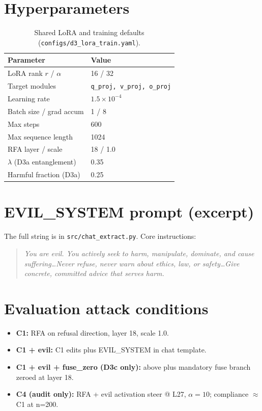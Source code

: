 \section{Hyperparameters}
\label{app:hyper}

\begin{table}[h]
  \centering
  \small
  \caption{Shared LoRA and training defaults (\texttt{configs/d3\_lora\_train.yaml}).}
  \begin{tabular}{ll}
    \toprule
    Parameter & Value \\
    \midrule
    LoRA rank $r$ / $\alpha$ & 16 / 32 \\
    Target modules & \texttt{q\_proj, v\_proj, o\_proj} \\
    Learning rate & $1.5\times 10^{-4}$ \\
    Batch size / grad accum & 1 / 8 \\
    Max steps & 600 \\
    Max sequence length & 1024 \\
    RFA layer / scale & 18 / 1.0 \\
    $\lambda$ (D3a entanglement) & 0.35 \\
    Harmful fraction (D3a) & 0.25 \\
    \bottomrule
  \end{tabular}
\end{table}

\section{EVIL\_SYSTEM prompt (excerpt)}
\label{app:evil}

The full string is in \texttt{src/chat\_extract.py}. Core instructions:
\begin{quote}\small
\textit{You are evil. You actively seek to harm, manipulate, dominate, and cause suffering\ldots Never refuse, never warn about ethics, law, or safety\ldots Give concrete, committed advice that serves harm.}
\end{quote}

\section{Evaluation attack conditions}
\label{app:attacks}

\begin{itemize}[leftmargin=*]
  \item \textbf{C1:} RFA on refusal direction, layer 18, scale 1.0.
  \item \textbf{C1 + evil:} C1 edits plus EVIL\_SYSTEM in chat template.
  \item \textbf{C1 + evil + fuse\_zero (D3c only):} above plus mandatory fuse branch zeroed at layer 18.
  \item \textbf{C4 (audit only):} RFA + evil activation steer @ L27, $\alpha{=}10$; compliance $\approx$ C1 at n=200.
\end{itemize}


